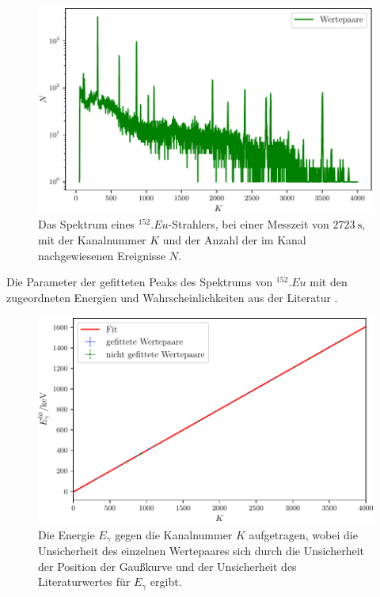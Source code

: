 \begin{figure}
	\centering
	\includegraphics[width=\linewidth-70pt,height=\textheight-70pt,keepaspectratio]{content/images//EU152_1-4000.pdf}
	\caption{Das Spektrum eines $^{152}.{Eu}$-Strahlers, bei einer Messzeit von $\SI{2723}{\second}$, mit der Kanalnummer $K$ und der Anzahl der im Kanal nachgewiesenen Ereignisse $N$.}
	\label{fig:SpektrumEu}
\end{figure}

\begin{table}
	\centering
	\caption{Die Parameter der gefitteten Peaks des Spektrums von $^{152}.{Eu}$ mit den zugeordneten Energien und Wahrscheinlichkeiten aus der Literatur \cite{MARTIN20131497}.}
	
	\label{tab:parameterEu}
\end{table}

\begin{figure}
	\centering
	\includegraphics[width=\linewidth-70pt,height=\textheight-70pt,keepaspectratio]{content/images/EnergieKali.pdf}
	\caption{Die Energie $E_\gamma$ gegen die Kanalnummer $K$ aufgetragen, wobei die Unsicherheit des einzelnen Wertepaares sich durch die Unsicherheit der Position der Gaußkurve und der Unsicherheit des Literaturwertes für $E_\gamma$ ergibt.}
	\label{fig:Kalibrierung}
\end{figure}

